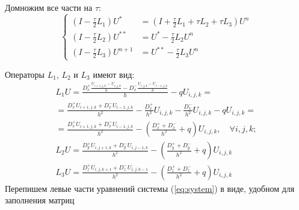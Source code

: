 \documentclass[a4paper,12pt]{article}
\begin{document}
Домножим все части на $\tau$:
\begin{equation*}
  \label{eq:system}
  \begin{cases}
      \left( I - \frac{\tau}{2} L_1 \right) U^{*} &=
          \left( I + \frac{\tau}{2} L_1 +  \tau L_2 + \tau L_3 \right) U^n \\
      \left( I - \frac{\tau}{2} L_2 \right) U^{**} & = U^{*} - \frac{\tau}{2} L_2 U^n \\
      \left( I - \frac{\tau}{2} L_3 \right) U^{n+1} & =  U^{**} - \frac{\tau}{2} L_3 U^n
  \end{cases}
\end{equation*}

Операторы $L_1$, $L_2$ и $L_3$ имеют вид:
\begin{equation}
  \begin{aligned}
    L_1 U = \frac{D^+_x \frac{U_{i+1,j,k} - U_{i,j,k}}{h} - D^-_x\frac{U_{i,j,k} - U_{i-1,j,k}}{h}}{h}  - qU_{i,j,k} = \\
    = \frac{D^+_x U_{i+1,j,k} + D^-_x U_{i-1,j,k}}{h^2} - \frac{D^+_x}{h^2}U_{i,j,k} - \frac{D^-_x}{h^2} U_{i,j,k} - q U_{i,j,k} = \\
    = \frac{D^+_x U_{i+1,j,k} + D^-_x U_{i-1,j,k}}{h^2} - \left(\frac{D^+_x + D^-_x}{h^2} + q \right) U_{i,j,k}, \quad \forall i,j,k; \\
    L_2 U = \frac{D^+_y U_{i,j+1,k} + D^-_y U_{i,j-1,k}}{h^2} - \left(\frac{D^+_y + D^-_y}{h^2} + q \right) U_{i,j,k} \\
    L_3 U = \frac{D^+_z U_{i,j,k+1} + D^-_z U_{i,j,k-1}}{h^2} - \left(\frac{D^+_z + D^-_z}{h^2} + q \right) U_{i,j,k}
  \end{aligned}
\end{equation}
Перепишем левые части уравнений системы (\ref{eq:system}) в виде, удобном для заполнения матриц
\end{document}
